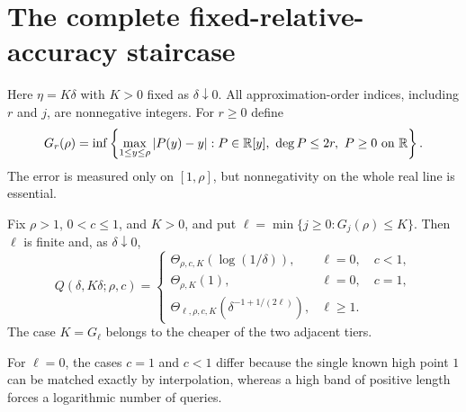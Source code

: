 \section{The complete fixed-relative-accuracy staircase}\label{sec:fixed}
Here $\eta=K\delta$ with $K>0$ fixed as $\delta\downarrow0$. All approximation-order indices, including $r$ and $j$, are nonnegative integers. For $r\geq0$ define
\begin{equation}\label{eq:G-definition}
 G_r(\rho)=\inf\left\{\max_{1\leq y\leq\rho}|P(y)-y|:
 P\in\mathbb R[y],\ \deg P\leq2r,\ P\geq0\text{ on }\mathbb R\right\}.
\end{equation}
The error is measured only on $[1,\rho]$, but nonnegativity on the whole real line is essential.

\begin{theorem}\label{thm:staircase}
Fix $\rho>1$, $0<c\leq1$, and $K>0$, and put
$\ell=\min\{j\geq0:G_j(\rho)\leq K\}$.
Then $\ell$ is finite and, as $\delta\downarrow0$,
\begin{equation}\label{eq:staircase}
 Q(\delta,K\delta;\rho,c)=
 \begin{cases}
 \Theta_{\rho,c,K}(\log(1/\delta)),&\ell=0,\quad c<1,\\
 \Theta_{\rho,K}(1),&\ell=0,\quad c=1,\\
 \Theta_{\ell,\rho,c,K}(\delta^{-1+1/(2\ell)}),&\ell\geq1.
 \end{cases}
\end{equation}
The case $K=G_\ell$ belongs to the cheaper of the two adjacent tiers.
\end{theorem}
For $\ell=0$, the cases $c=1$ and $c<1$ differ because the single known high point $1$ can be matched exactly by interpolation, whereas a high band of positive length forces a logarithmic number of queries.

